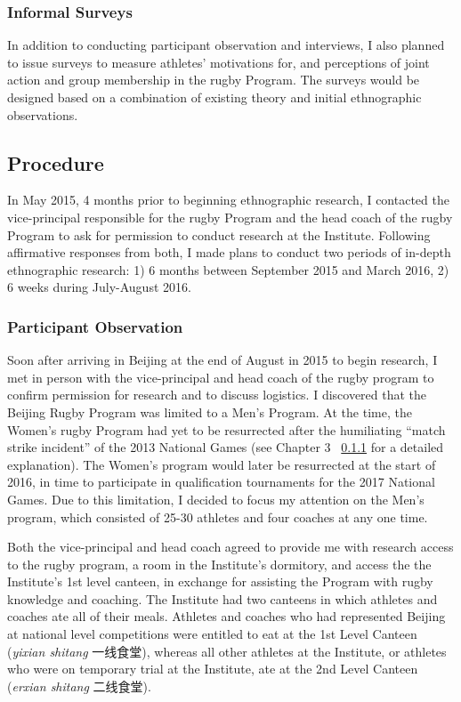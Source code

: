   \subsubsection{Informal Surveys}
  In addition to conducting participant observation and interviews, I also planned to issue surveys to measure athletes' motivations for, and perceptions of joint action and group membership in the rugby Program.  The surveys would be designed based on a combination of existing theory and initial ethnographic observations.


\subsection{Procedure}

In May 2015, 4 months prior to beginning ethnographic research, I contacted the vice-principal responsible for the rugby Program and the head coach of the rugby Program to ask for permission to conduct research at the Institute.  Following affirmative responses from both, I made plans to conduct two periods of in-depth ethnographic research: 1) 6 months between September 2015 and March 2016, 2) 6 weeks during July-August 2016.

\subsubsection{Participant Observation}
Soon after arriving in Beijing at the end of August in 2015 to begin research, I met in person with the vice-principal and head coach of the rugby program to confirm permission for research and to discuss logistics.  I discovered that the Beijing Rugby Program was limited to a Men's Program.  At the time, the Women's rugby Program had yet to be resurrected after the humiliating ``match strike incident'' of the 2013 National Games (see Chapter 3 ~\ref{} for a detailed explanation). The Women's program would later be resurrected at the start of 2016, in time to participate in qualification tournaments for the 2017 National Games.  Due to this limitation, I decided to focus my attention on the Men's program, which consisted of 25-30 athletes and four coaches at any one time.

Both the vice-principal and head coach agreed to provide me with research access to the rugby program, a room in the Institute's dormitory, and access the the Institute's 1st level canteen, in exchange for assisting the Program with rugby knowledge and coaching.   The Institute had two canteens in which athletes and coaches ate all of their meals.  Athletes and coaches who had represented Beijing at national level competitions were entitled to eat at the 1st Level Canteen (\textit{yixian shitang} 一线食堂), whereas all other athletes at the Institute, or athletes who were on temporary trial at the Institute, ate at the 2nd Level Canteen (\textit{erxian shitang} 二线食堂).

